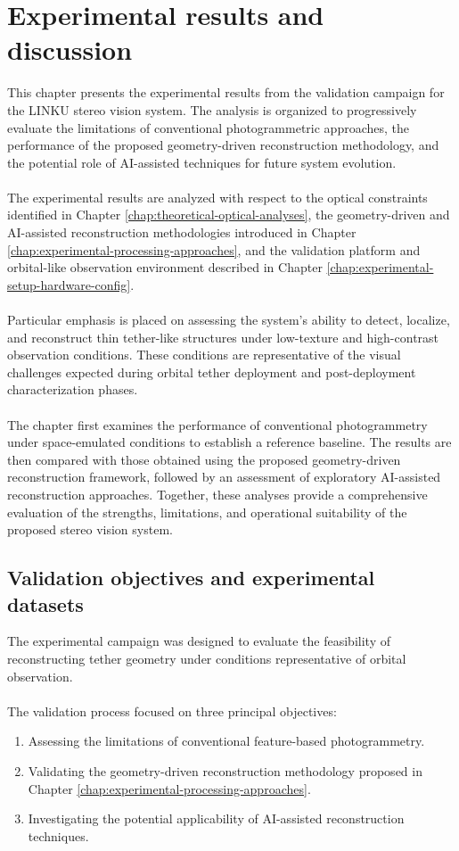 \chapter{Experimental results and discussion}
\label{chap:experimental-results}

This chapter presents the experimental results from the validation campaign for the LINKU stereo vision system. The analysis is organized to progressively evaluate the limitations of conventional photogrammetric approaches, the performance of the proposed geometry-driven reconstruction methodology, and the potential role of AI-assisted techniques for future system evolution.
\\\\
The experimental results are analyzed with respect to the optical constraints identified in Chapter \ref{chap:theoretical-optical-analyses}, the geometry-driven and AI-assisted reconstruction methodologies introduced in Chapter \ref{chap:experimental-processing-approaches}, and the validation platform and orbital-like observation environment described in Chapter \ref{chap:experimental-setup-hardware-config}.
\\\\
Particular emphasis is placed on assessing the system's ability to detect, localize, and reconstruct thin tether-like structures under low-texture and high-contrast observation conditions. These conditions are representative of the visual challenges expected during orbital tether deployment and post-deployment characterization phases.
\\\\
The chapter first examines the performance of conventional photogrammetry under space-emulated conditions to establish a reference baseline. The results are then compared with those obtained using the proposed geometry-driven reconstruction framework, followed by an assessment of exploratory AI-assisted reconstruction approaches. Together, these analyses provide a comprehensive evaluation of the strengths, limitations, and operational suitability of the proposed stereo vision system.

\section{Validation objectives and experimental datasets}
\label{sec:validation-objectives-experimental-datasets}

The experimental campaign was designed to evaluate the feasibility of reconstructing tether geometry under conditions representative of orbital observation.
\\\\
The validation process focused on three principal objectives:
\begin{enumerate}
    \item Assessing the limitations of conventional feature-based photogrammetry.
    \item Validating the geometry-driven reconstruction methodology proposed in Chapter \ref{chap:experimental-processing-approaches}.
    \item Investigating the potential applicability of AI-assisted reconstruction techniques.
\end{enumerate}

